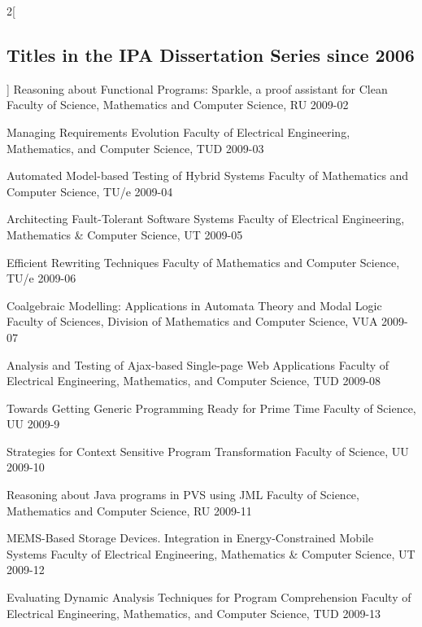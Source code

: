 \begin{multicols}{2}[\subsection*{Titles in the IPA Dissertation Series since 2006}]
         {Reasoning about Functional Programs: Sparkle, a proof assistant for Clean}
         {Faculty of Science, Mathematics and Computer Science, RU}
         {2009-02}

         {Managing Requirements Evolution}
         {Faculty of Electrical Engineering, Mathematics, and Computer Science, TUD}
         {2009-03}

         {Automated Model-based Testing of Hybrid Systems}
         {Faculty of Mathematics and Computer Science, TU/e}
         {2009-04}

         {Architecting Fault-Tolerant Software Systems}
         {Faculty of Electrical Engineering, Mathematics \& Computer Science, UT}
         {2009-05}

         {Efficient Rewriting Techniques}
         {Faculty of Mathematics and Computer Science, TU/e}
         {2009-06}

         {Coalgebraic Modelling: Applications in Automata Theory and Modal Logic}
         {Faculty of Sciences, Division of Mathematics and Computer Science, VUA}
         {2009-07}

         {Analysis and Testing of Ajax-based Single-page Web Applications}
         {Faculty of Electrical Engineering, Mathematics, and Computer Science, TUD}
         {2009-08}

         {Towards Getting Generic Programming Ready for Prime Time}
         {Faculty of Science, UU}
         {2009-9}

         {Strategies for Context Sensitive Program Transformation}
         {Faculty of Science, UU}
         {2009-10}

         {Reasoning about Java programs in PVS using JML}
         {Faculty of Science, Mathematics and Computer Science, RU}
         {2009-11}

         {MEMS-Based Storage Devices. Integration in Energy-Constrained Mobile Systems}
         {Faculty of Electrical Engineering, Mathematics \& Computer Science, UT}
         {2009-12}

         {Evaluating Dynamic Analysis Techniques for Program Comprehension}
         {Faculty of Electrical Engineering, Mathematics, and Computer Science, TUD}
         {2009-13}


\end{multicols}
